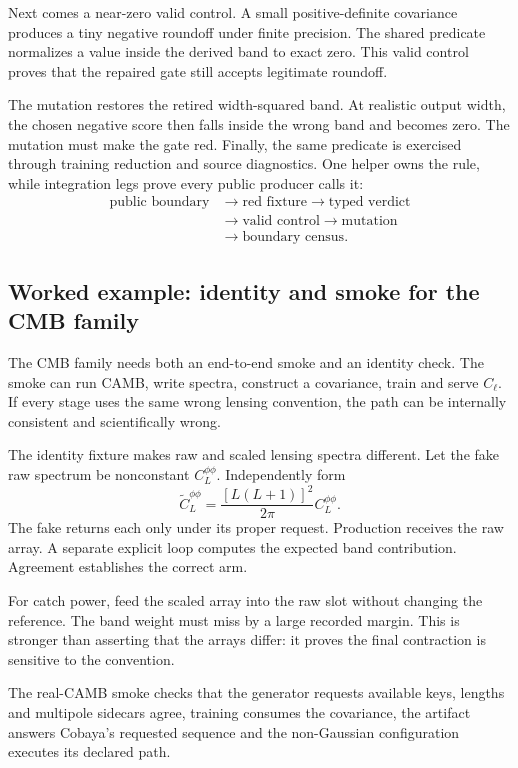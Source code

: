 \documentclass[10pt,aps,prd,twocolumn,nofootinbib]{revtex4-2}
\begin{document}
Next comes a near-zero valid control.  A small positive-definite covariance
produces a tiny negative roundoff under finite precision.  The shared
predicate normalizes a value inside the derived band to exact zero.  This
valid control proves that the repaired gate still accepts legitimate
roundoff.

The mutation restores the retired width-squared band.  At realistic output
width, the chosen negative score then falls inside the wrong band and becomes
zero.  The mutation must make the gate red.  Finally, the same predicate is
exercised through training reduction and source diagnostics.  One helper owns
the rule, while integration legs prove every public producer calls it:
\begin{align*}
\text{public boundary}&\rightarrow\text{red fixture}
\rightarrow\text{typed verdict}\\
&\rightarrow\text{valid control}
\rightarrow\text{mutation}\\
&\rightarrow\text{boundary census}.
\end{align*}

\subsection{Worked example: identity and smoke for the CMB family}

The CMB family needs both an end-to-end smoke and an identity check.  The smoke can run
CAMB, write spectra, construct a covariance, train and serve \(C_\ell\).
If every stage uses the same wrong lensing convention, the path can be
internally consistent and scientifically wrong.

The identity fixture makes raw and scaled lensing spectra different.  Let the
fake raw spectrum be nonconstant \(C_L^{\phi\phi}\).  Independently form
\begin{equation*}
 \widetilde C_L^{\phi\phi}
 =\frac{[L(L+1)]^2}{2\pi}C_L^{\phi\phi}.
\end{equation*}
The fake returns each only under its proper request.  Production receives the
raw array.  A separate explicit loop computes the expected band contribution.
Agreement establishes the correct arm.

For catch power, feed the scaled array into the raw slot without changing the
reference.  The band weight must miss by a large recorded margin.  This is
stronger than asserting that the arrays differ: it proves the final
contraction is sensitive to the convention.

The real-CAMB smoke checks that the generator requests available keys, lengths
and multipole sidecars agree, training consumes the covariance, the artifact
answers Cobaya's requested sequence and the non-Gaussian configuration
executes its declared path.
\end{document}
